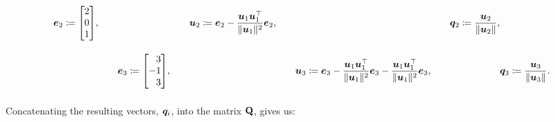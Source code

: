 \documentclass[11pt]{article}
\begin{document}
\begin{enumerate}
\begin{enumerate}[align=left]
\[\begin{alignedat}{3}
                            \vect{e}_2
                            \coloneq
                            \begin{bmatrix}
                                2 \\ 0 \\ 1
                            \end{bmatrix}
                            \! ,
                            \qquad
                             &   &
                            \vect{u}_2
                            \coloneq
                            \vect{e}_2
                            -
                            \frac{ \vect{u}_1 \vect{u}_1^\top }{ \norm{\vect{u}_1}^2 }
                            \vect{e}_2
                            ,
                            \qquad
                             &   &
                            \vect{q}_2
                            \coloneq
                            \frac{\vect{u}_2}{\norm{\vect{u}_2}}
                            ,
                            \\[1em]
                             &
                            \vect{e}_3
                            \coloneq
                            \begin{bmatrix*}[r]
                                3 \\ -1 \\ 3
                            \end{bmatrix*}
                            \! ,
                            \qquad
                             &   &
                            \vect{u}_3
                            \coloneq
                            \vect{e}_3
                            -
                            \frac{ \vect{u}_1 \vect{u}_1^\top }{ \norm{\vect{u}_1}^2 }
                            \vect{e}_3
                            -
                            \frac{ \vect{u}_1 \vect{u}_1^\top }{ \norm{\vect{u}_1}^2 }
                            \vect{e}_3
                            ,
                            \qquad
                             &   &
                            \vect{q}_3
                            \coloneq
                            \frac{\vect{u}_3}{\norm{\vect{u}_3}}
                            .
                            \\[1em]
                        \end{alignedat}
                    \]
                    Concatenating the resulting vectors, $\bm{q}_i$, into the matrix $\mathbf{Q}$, gives us:
                    \[
\]
\end{enumerate}
\end{enumerate}
\end{document}
